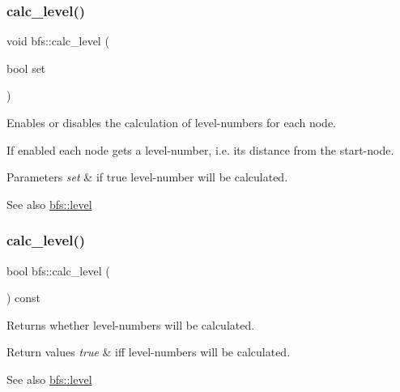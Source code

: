 \subsubsection{\texorpdfstring{calc\+\_\+level()}{calc\_level()}\hspace{0.1cm}{\footnotesize\ttfamily [1/2]}}
{\footnotesize\ttfamily void bfs\+::calc\+\_\+level (\begin{DoxyParamCaption}\item[{bool}]{set }\end{DoxyParamCaption})}



Enables or disables the calculation of level-\/numbers for each node. 

If enabled each node gets a level-\/number, i.\+e. its distance from the start-\/node.


\begin{DoxyParams}{Parameters}
{\em set} & if true level-\/number will be calculated. \\
\hline
\end{DoxyParams}
\begin{DoxySeeAlso}{See also}
\mbox{\hyperlink{classbfs_ac0158a0453fb17a89be4049d21db56b1}{bfs\+::level}} 
\end{DoxySeeAlso}
\mbox{\label{classbfs_a78ea23abb1461e62dd7ecd416fecbd96}} 
\subsubsection{\texorpdfstring{calc\+\_\+level()}{calc\_level()}\hspace{0.1cm}{\footnotesize\ttfamily [2/2]}}
{\footnotesize\ttfamily bool bfs\+::calc\+\_\+level (\begin{DoxyParamCaption}{ }\end{DoxyParamCaption}) const\hspace{0.3cm}{\ttfamily [inline]}}



Returns whether level-\/numbers will be calculated. 


\begin{DoxyRetVals}{Return values}
{\em true} & iff level-\/numbers will be calculated. \\
\hline
\end{DoxyRetVals}
\begin{DoxySeeAlso}{See also}
\mbox{\hyperlink{classbfs_ac0158a0453fb17a89be4049d21db56b1}{bfs\+::level}} 
\end{DoxySeeAlso}
\mbox{\label{classbfs_a6dd7e852f7768814aafba8962befca56}} 
